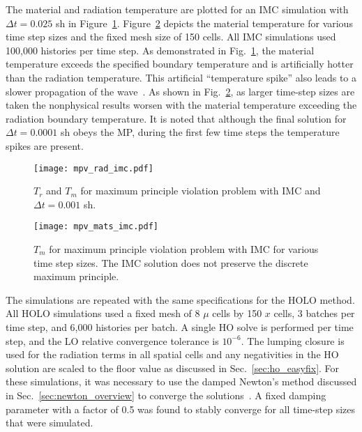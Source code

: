 The material and radiation temperature are plotted for an IMC simulation with $\Delta
t=0.025$ sh in Figure~\ref{fig:imc_mpvrad}.  Figure~\ref{fig:imc_mpv} depicts the material temperature
for various time step sizes and the fixed mesh size of 150 cells. All IMC
simulations used 100,000 histories per time step. As demonstrated in
Fig.~\ref{fig:imc_mpvrad}, the material temperature exceeds the specified boundary
temperature and is artificially hotter than the radiation temperature.  This artificial
``temperature spike'' also leads to a slower propagation of the
wave~\cite{wollaber2013discrete}.  As shown in
Fig.~\ref{fig:imc_mpv}, as larger time-step sizes are taken the nonphysical results
worsen with the material temperature exceeding the radiation boundary temperature.
It is noted that although the final solution for $\Delta t=0.0001$ sh obeys the MP, during
the first few time steps the temperature spikes are present.
\begin{figure}[htbp]
    \centering
    \texttt{[image: mpv\_rad\_imc.pdf]}
    \caption{\label{fig:imc_mpvrad}$T_r$ and $T_m$ for maximum principle violation problem with IMC and $\Delta t = 0.001$ sh.}
\end{figure}
\begin{figure}[htbp]
    \centering
    \texttt{[image: mpv\_mats\_imc.pdf]}
    \caption{\label{fig:imc_mpv}$T_m$ for maximum principle violation problem with IMC for various time step
    sizes. The IMC solution does not preserve the discrete maximum principle.}
\end{figure}

The simulations are repeated with the same specifications for the HOLO method. All HOLO
simulations used a fixed mesh of 8 $\mu$ cells by 150 $x$ cells, 3 batches per time step,
and 6,000 histories per batch. A single HO solve is performed per time step, and the LO
relative convergence tolerance is $10^{-6}$. The lumping closure is used for the radiation
terms in all spatial cells and any negativities in the HO solution are scaled to the floor
value as discussed in Sec.~\ref{sec:ho_easyfix}.  For these simulations, it was
necessary to use the damped Newton's method discussed in Sec.~\ref{sec:newton_overview} to converge the solutions~\cite{damped_newton}. 
 A fixed damping parameter with a factor of 0.5 was found to stably converge for all
 time-step sizes that were simulated. 

